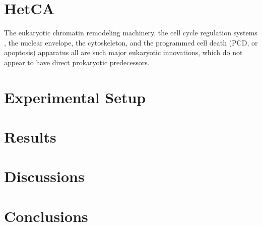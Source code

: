 \documentclass{sig-alternate-05-2015}
\begin{document}
\section{HetCA}

The eukaryotic chromatin remodeling machinery, the cell cycle regulation
systems \cite{koonin2002origin}, the nuclear envelope, the cytoskeleton, and the
programmed cell death (PCD, or apoptosis) apparatus all are
such major eukaryotic innovations, which do not appear to
have direct prokaryotic predecessors. 

\section{Experimental Setup}

\section{Results}

\section{Discussions}


\section{Conclusions}
{}



\end{document}

